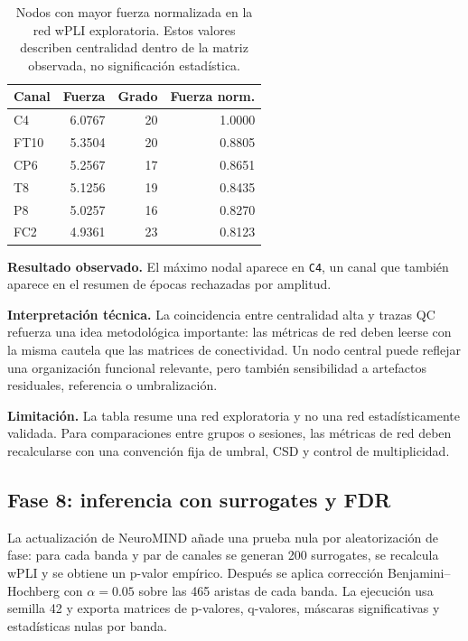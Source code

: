 \begin{table}[H]
\centering
\caption{Nodos con mayor fuerza normalizada en la red wPLI exploratoria. Estos valores describen centralidad dentro de la matriz observada, no significación estadística.}
\label{tab:results-network-nodes}
\begin{tabular}{lrrr}
\toprule
Canal & Fuerza & Grado & Fuerza norm. \\
\midrule
C4 & 6.0767 & 20 & 1.0000 \\
FT10 & 5.3504 & 20 & 0.8805 \\
CP6 & 5.2567 & 17 & 0.8651 \\
T8 & 5.1256 & 19 & 0.8435 \\
P8 & 5.0257 & 16 & 0.8270 \\
FC2 & 4.9361 & 23 & 0.8123 \\
\bottomrule
\end{tabular}
\end{table}

\textbf{Resultado observado.} El máximo nodal aparece en \texttt{C4}, un canal que también aparece en el resumen de épocas rechazadas por amplitud.

\textbf{Interpretación técnica.} La coincidencia entre centralidad alta y trazas QC refuerza una idea metodológica importante: las métricas de red deben leerse con la misma cautela que las matrices de conectividad. Un nodo central puede reflejar una organización funcional relevante, pero también sensibilidad a artefactos residuales, referencia o umbralización.

\textbf{Limitación.} La tabla resume una red exploratoria y no una red estadísticamente validada. Para comparaciones entre grupos o sesiones, las métricas de red deben recalcularse con una convención fija de umbral, CSD y control de multiplicidad.

\subsection{Fase 8: inferencia con surrogates y FDR}

La actualización de NeuroMIND añade una prueba nula por aleatorización de fase: para cada banda y par de canales se generan 200 surrogates, se recalcula wPLI y se obtiene un p-valor empírico. Después se aplica corrección Benjamini--Hochberg con $\alpha=0.05$ sobre las 465 aristas de cada banda. La ejecución usa semilla 42 y exporta matrices de p-valores, q-valores, máscaras significativas y estadísticas nulas por banda.

